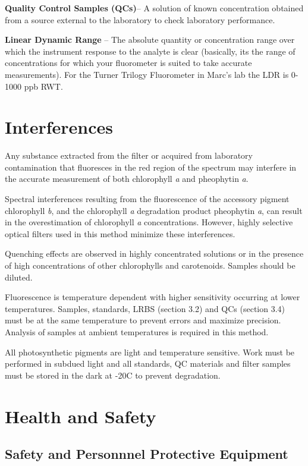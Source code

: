\documentclass[12pt]{../SOP3}\usepackage[]{graphicx}\usepackage[]{color}
\begin{document}
\NP \textbf{Quality Control Samples (QCs)}-- A solution of known concentration obtained from a source external to the laboratory to check laboratory performance.

\NP \textbf{Linear Dynamic Range} -- The absolute quantity or concentration range over which the instrument response to the analyte is clear (basically, its the range of concentrations for which your fluorometer is suited to take accurate measurements). For the Turner Trilogy Fluorometer in Marc's lab the LDR is 0-1000 ppb RWT. 


\section{Interferences}
\NP Any substance extracted from the filter or acquired from laboratory contamination that fluoresces in the red region of the spectrum may interfere in the accurate measurement of both chlorophyll \textit{a} and pheophytin \textit{a}.

\NP Spectral interferences resulting from the fluorescence of the accessory pigment chlorophyll \textit{b}, and the chlorophyll \textit{a} degradation product pheophytin \textit{a}, can result in the overestimation of chlorophyll \textit{a} concentrations. However, highly selective optical filters used in this method minimize these interferences.

\NP Quenching effects are observed in highly concentrated solutions or in the presence of high concentrations of other chlorophylls and carotenoids. Samples should be diluted.

\NP Fluorescence is temperature dependent with higher sensitivity occurring at lower temperatures. Samples, standards, LRBS (section 3.2) and QCs (section 3.4) must be at the same temperature to prevent errors and maximize precision. Analysis of samples at ambient temperatures is required in this method.

\NP All photosynthetic pigments are light and temperature sensitive. Work must be performed in subdued light and all standards, QC materials and filter samples must be stored in the dark at -20\degree C to prevent degradation.

\section{Health and Safety}

\subsection*{Safety and Personnnel Protective Equipment}
\end{document}
